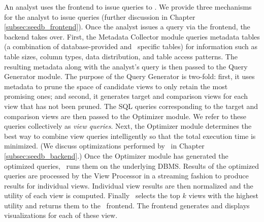 An analyst uses the frontend to issue queries to \SeeDB. We provide three
mechanisms for the analyst to issue queries (further discussion in
Chapter \ref{subsec:seedb_frontend}).
Once the analyst issues a query via the frontend, the backend takes over.
First, the Metadata Collector module queries metadata tables (a combination of
database-provided and \SeeDB\ specific tables) for information such as table
sizes, column types, data distribution, and table access patterns.
The resulting metadata along with the analyst's query is then passed to the
Query Generator module. The purpose of the Query Generator is two-fold:
first, it uses metadata to prune the space of candidate views to only retain the
most promising ones; and second, it generates target and comparison views for
each view that has not been pruned.
The SQL queries corresponding to the target and comparison views are then passed
to the Optimizer module. We refer to these queries collectively as {\it view
queries}.
Next, the Optimizer module determines the best way to
combine view queries intelligently so that the total execution time is
minimized.
(We discuss optimizations performed by \SeeDB\ in Chapter
\ref{subsec:seedb_backend}.) Once the Optimizer module has generated the
optimized queries, \SeeDB\ runs them on the underlying DBMS.
Results of the optimized queries are processed by the View Processor in a
streaming fashion to produce results for individual views. Individual view
results are then normalized and the utility of each view is computed.
Finally \SeeDB\ selects the top $k$ views with the highest utility and returns
them to the \SeeDB\ frontend. The frontend generates 
and displays visualizations for each of these view.